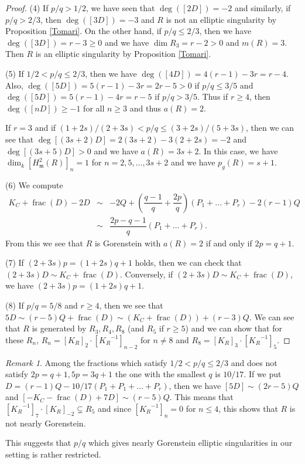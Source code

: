\documentclass[12pt]{amsart}
\theoremstyle{definition}
\theoremstyle{remark}
\newtheorem{rem}[thm]{Remark}
\numberwithin{equation}{section}
\DeclareMathOperator{\FRC}{frac}
\newcommand{\m}{\mathfrak m}
\newcommand{\KiR}{{K_R}^{-1}}
\renewcommand{\:}{\colon}
\begin{document}
\begin{proof}
\par \vspace{1mm}
(4) If $p/q > 1/2$, we have seen that $\deg ([2D]) =-2$ and similarly, if $p/q > 2/3$, 
then $\deg([3D]) = -3$ and $R$ is not an elliptic singularity by Proposition \ref{Tomari}. 
On the other hand, if $p/q \le 2/3$, then we have $\deg([3D]) = r-3\ge 0$ and we have 
$\dim R_3 = r-2 > 0$ and  $m(R) = 3$. Then $R$ is an elliptic singularity by Proposition 
\ref{Tomari}. 
\par \vspace{1mm}
(5) If  $1/2< p/q \le 2/3$, then we have  $\deg([4D]) = 4(r-1) - 3r = r-4$. 
Also, $\deg([5D]) = 5(r-1)-3r = 2r -5 >0$ if $p/q \le 3/5$ and 
$\deg([5D]) = 5(r-1)-4r = r-5$ if $p/q > 3/5$. Thus if $r \ge 4$, then 
$\deg ([nD])\ge -1$ for all $n\ge 3$ and thus $a(R)=2$. 
\par 
If $r=3$ and if $(1+2s)/(2+3s) < p/q \le (3+2s)/(5+3s)$, then we can see that 
$\deg[ (3s+2) D] = 2 (3s+2) - 3(2+2s) = -2$ and  $\deg[ (3s+5) D] >0$ 
and we have $a(R) = 3s+2$.  In this case, we have 
$\dim_k [H^2_{\m}(R)]_n = 1$ for 
$n = 2,5, \ldots , 3s+2$ and we have $p_g(R)=s+1$.  
\par \vspace{1mm}
(6) We compute 
\begin{eqnarray*}
K_C + \FRC(D) - 2D 
& \sim & -2Q + \left( \dfrac{q-1}{q}+ \dfrac{2p}{q}\right) (P_1+\ldots + P_r) - 2(r-1)Q  \\[1mm]
&\sim & \dfrac{2p-q-1}{q}(P_1+\ldots + P_r). 
\end{eqnarray*}
From this we see that $R$ is Gorenstein with $a(R)=2$ if and only if $2p=q+1$. 
\par \vspace{1mm}
(7) If $(2+3s)p=(1+2s)q+1$ holds, then we can check that $(2+3s)D \sim K_C + \FRC(D)$. 
Conversely, if $(2+3s)D \sim K_C + \FRC(D)$, we have $(2+3s)p=(1+2s)q+1$. 
\par \vspace{1mm}
(8) If $p/q = 5/8$ and $r\ge 4$, then we see that 
$5D \sim (r-5)Q +\FRC(D) \sim (K_C +\FRC(D)) + (r-3) Q$. 
We can see that $R$ is generated by $R_3, R_4, R_8$
 (and $R_5$ if $r\ge 5$) 
 and we can show that for these $R_n$,  
 $R_n = [K_R]_2\cdot [\KiR]_{n-2}$ for $n\ne 8$ and $R_8 =  [K_R]_3\cdot [\KiR]_5$. 
\end{proof}

\begin{rem} 
Among the fractions which satisfy $1/2 < p/q \le 2/3$ and does not satisfy $2p=q+1, 5p=3q+1$ the one with the smallest $q$  is $10/17$. 
If we put $D= (r-1)Q -10/17 (P_1+ P_1+\ldots + P_r)$, 
then we have $[5D] \sim (2r-5)Q$ and 
$[-K_C - \FRC(D) + 7D ] \sim (r-5)Q$.  This means that $[\KiR]_7\cdot [K_R]_{-2}
\subsetneq R_5$ and since $[\KiR]_n =0$ for $n\le 4$, this shows that 
$R$ is not nearly Gorenstein. \par
This suggests that $p/q$ which gives nearly Gorenstein elliptic singularities in our setting is rather restricted.    
\end{rem}
\end{document}
